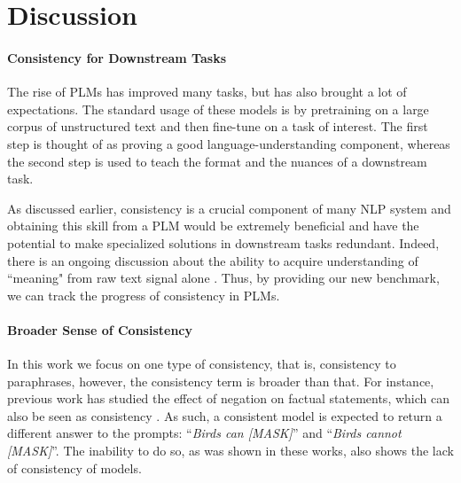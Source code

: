 \section{Discussion}
\label{sec:discussion}

\paragraph{Consistency for Downstream Tasks}

The rise of PLMs has improved many tasks, but has also brought a lot of expectations. The standard usage of these models is by pretraining on a large corpus of unstructured text and then fine-tune on a task of interest. The first step is thought of as proving a good language-understanding component, whereas the second step is used to teach the format and the nuances of a downstream task.

As discussed earlier, consistency is a crucial component of many NLP system \cite{du2019consistent,consistent-qa,denis2009global,kryscinski2020evaluating} and obtaining this skill from a PLM would be extremely beneficial and have the potential to make specialized solutions in downstream tasks redundant.
Indeed, there is an ongoing discussion about the ability to acquire understanding of ``meaning" from raw text signal alone \cite{bender2020climbing}.
Thus, by providing our new benchmark, we can track the progress of consistency in PLMs.


\paragraph{Broader Sense of Consistency}
In this work we focus on one type of consistency, that is, consistency to paraphrases, however, the consistency term is broader than that.
For instance, previous work has studied the effect of negation on factual statements, which can also be seen as consistency \cite{Ettinger_2020,kassner-schutze-2020-negated}. As such, a consistent model is expected to return a different answer to the prompts: ``\textit{Birds can [MASK]}'' and ``\textit{Birds cannot [MASK]}''. The inability to do so, as was shown in these works, also shows the lack of consistency of models.


